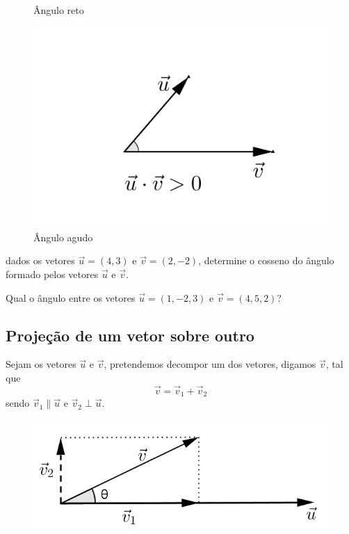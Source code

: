 \begin{figure}[H]
\begin{minipage}[b]{0.3\linewidth}
\caption{Ângulo reto}
\end{minipage}\hfill
\begin{minipage}[b]{0.3\linewidth}
\includegraphics[width=\linewidth]{analitica/imagens/angvetores3.png}
\caption{Ângulo agudo}
\end{minipage}
\end{figure}

\begin{exemplo} dados os vetores $\vec{u}= (4, 3)$ e $\vec{v}=(2,-2)$, determine o cosseno do ângulo formado pelos vetores $\vec{u}$ e $\vec{v}$.
\end{exemplo}

\vspace{2cm}

\begin{exemplo} Qual o ângulo entre os vetores $\vec{u}=(1,-2, 3)$ e $\vec{v}=(4,5,2)$?
\end{exemplo}

\vspace{2cm}

\subsection{Projeção de um vetor sobre outro}

Sejam os vetores $\vec u$ e $\vec v$, pretendemos decompor um dos vetores, digamos $\vec v$, tal que $$\vec v=\vec v_1+\vec v_2$$ sendo $\vec v_1\parallel\vec u$ e $\vec v_2 \perp \vec u$.

\begin{figure}[H]
\centering
\includegraphics[scale=1]{analitica/imagens/projecao.png}
\end{figure}

